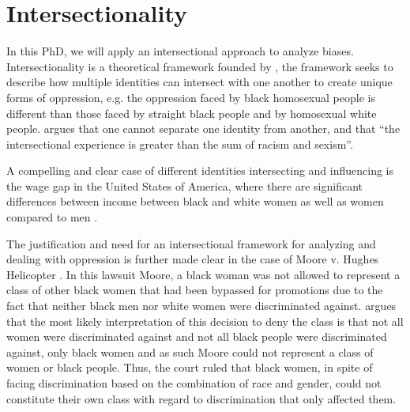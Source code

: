 %
%

\section{Intersectionality}\label{sec:intersectionality}

In this PhD, we will apply an intersectional approach to analyze biases. Intersectionality is a theoretical framework founded by \cite{Crenshaw:1989}, the framework seeks to describe how multiple identities can intersect with one another to create unique forms of oppression, e.g. the oppression faced by black homosexual people is different than those faced by straight black people and by homosexual white people. \cite{Crenshaw:1989} argues that one cannot separate one identity from another, and that ``the intersectional experience is greater than the sum of racism and sexism''.

A compelling and clear case of different identities intersecting and influencing is the wage gap in the United States of America, where there are significant differences between income between black and white women as well as women compared to men \citep{Neal:2004}.

The justification and need for an intersectional framework for analyzing and dealing with oppression is further made clear in the case of Moore v. Hughes Helicopter \citep{Crenshaw:1989}. In this lawsuit Moore, a black woman was not allowed to represent a class of other black women that had been bypassed for promotions due to the fact that neither black men nor white women were discriminated against. \cite{Crenshaw:1989} argues that the most likely interpretation of this decision to deny the class is that not all women were discriminated against and not all black people were discriminated against, only black women and as such Moore could not represent a class of women or black people. Thus, the court ruled that black women, in spite of facing discrimination based on the combination of race and gender, could not constitute their own class with regard to discrimination that only affected them.

